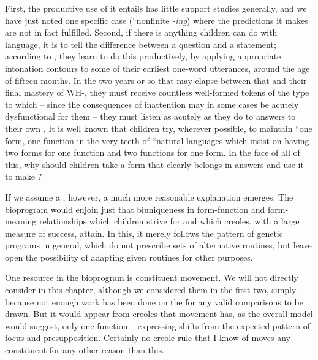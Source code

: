 First, the productive use of  it entails has little support  studies generally, and we have just noted one specific case (``nonfinite \textit{-ing}) where the predictions it makes are not in fact fulfilled. Second, if there is anything children can do with language, it is to tell the difference between a question and a statement; according to \citet{Halliday1975}, they learn to do this productively, by applying appropriate intonation contours to some of their earliest one-word utterances, around the age of fifteen months. In the two years or so that may elapse between that  and their final mastery of  WH-, they must receive countless well-formed tokens of the type to which -- since the consequences of inattention may in some cases be acutely dysfunctional for them -- they must listen as acutely as they do to answers to their own . It is well known that children try, wherever possible, to maintain ``one form, one function in the very teeth of ``natural languages which insist on having two forms for one function and two functions for one form. In the face of
all of this, why should children take a form that clearly belongs in answers and use it to make ?

If we assume a , however, a much more reasonable explanation emerges. The bioprogram would enjoin just that biuniqueness in form-function and form-meaning relationships which children strive for and which creoles, with a large measure of success, attain. In this, it merely follows the pattern of genetic programs in general, which do not prescribe sets of alternative routines, but leave open the possibility of adapting given routines for other purposes.

One resource in the bioprogram is constituent movement. We will not directly consider  in this chapter, although we considered them in the first two, simply because not enough work has been done on the   for any valid comparisons to be drawn. But it would appear from creoles that movement has, as the overall model would suggest, only one function -- expressing shifts from the expected pattern of focus and presupposition. Certainly no creole rule that I know of moves any constituent for any other reason than this.

